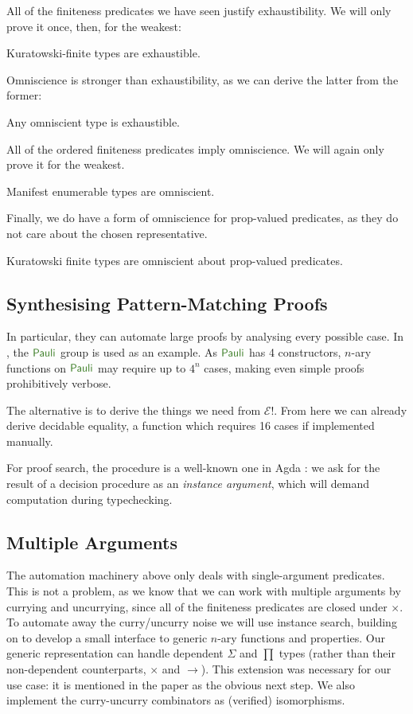 All of the finiteness predicates we have seen justify exhaustibility.
We will only prove it once, then, for the weakest:
\begin{romtheorem}
  Kuratowski-finite types are exhaustible.
\end{romtheorem}
Omniscience is stronger than exhaustibility, as we can derive the latter from
the former:
\begin{romlemma} \label{omniscient-is-exhaustible}
  Any omniscient type is exhaustible.
\end{romlemma}
All of the ordered finiteness predicates imply omniscience.
We will again only prove it for the weakest.
\begin{romtheorem}
  Manifest enumerable types are omniscient.
\end{romtheorem}
Finally, we do have a form of omniscience for prop-valued predicates, as they do
not care about the chosen representative.
\begin{romtheorem}
  Kuratowski finite types are omniscient about prop-valued predicates.
\end{romtheorem}
\subsection{Synthesising Pattern-Matching Proofs}
In particular, they can automate large proofs by analysing every possible case.
In \cite{firsovDependentlyTypedProgramming2015}, the \(\AgdaDatatype{Pauli}\)
group is used as an example.
As \(\AgdaDatatype{Pauli}\) has 4 constructors, \(n\)-ary functions on
\(\AgdaDatatype{Pauli}\) may require up to \(4^n\) cases, making even simple
proofs prohibitively verbose.

The alternative is to derive the things we need from \(\mathcal{E}!\).
From here we can already derive decidable equality, a function which requires 16
cases if implemented manually.

For proof search, the procedure is a well-known one in Agda
\cite{devrieseBrightSideType2011}: we ask for the result of a decision procedure
as an \emph{instance argument}, which will demand computation during
typechecking.
\subsection{Multiple Arguments}
The automation machinery above only deals with single-argument predicates.
This is not a problem, as we know that we can work with multiple arguments by
currying and uncurrying, since all of the finiteness predicates are closed under
\(\times\).
To automate away the curry/uncurry noise we will use instance search, building
on \cite{allaisGenericLevelPolymorphic2019} to develop a small interface to
generic \(n\)-ary functions and properties.
Our generic representation can handle dependent \(\Sigma\) and \(\prod\)
types (rather than their non-dependent counterparts, \(\times\) and
\(\rightarrow\)).
This extension was necessary for our use case: it is mentioned in the paper
as the obvious next step. 
We also implement the curry-uncurry combinators as (verified) isomorphisms.

